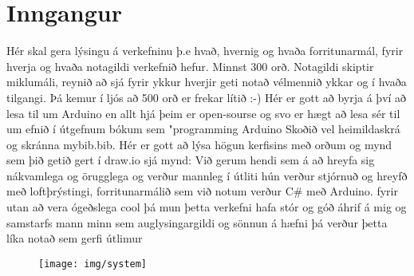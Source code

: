 \section{Inngangur}
Hér skal gera lýsingu á verkefninu þ.e hvað,  hvernig og  hvaða forritunarmál, fyrir hverja og hvaða notagildi verkefnið hefur. Minnst 300 orð. Notagildi skiptir miklumáli, reynið að sjá fyrir ykkur hverjir geti notað vélmennið ykkar og í hvaða tilgangi.  Þá kemur í ljós að 500 orð er frekar lítið :-) Hér er gott að byrja á því að lesa til um Arduino en allt hjá þeim er open-sourse og svo er hægt að lesa sér til um efnið í útgefnum bókum sem "programming Arduino \cite{monk} Skoðið vel heimildaskrá og skránna mybib.bib. Hér er gott að lýsa högun kerfisins með orðum og mynd sem þið getið gert í draw.io sjá mynd: 
Við gerum hendi sem á að hreyfa sig nákvamlega og örugglega og verður mannleg í útliti hún verður stjórnuð og hreyfð  með  loftþrýstingi, forritunarmálið sem við notum verður C# með Arduino.
fyrir utan að vera ógeðslega cool þá mun þetta verkefni hafa stór og góð áhrif á mig og samstarfs mann minn sem auglysingargildi og sönnun á hæfni þá verður
þetta líka notað sem gerfi útlimur
\begin{figure}[h]
\texttt{[image: img/system]}
\end{figure}